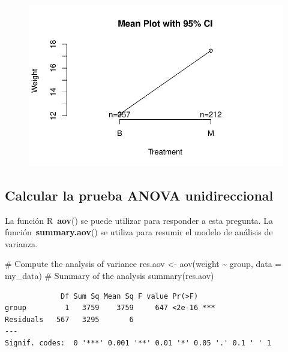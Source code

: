 \documentclass[
  letterpaper,
  DIV=11,
  numbers=noendperiod]{scrartcl}
\newenvironment{Shaded}{\begin{snugshade}}{\end{snugshade}}
\newcommand{\AttributeTok}[1]{\textcolor[rgb]{0.40,0.45,0.13}{#1}}
\newcommand{\CommentTok}[1]{\textcolor[rgb]{0.37,0.37,0.37}{#1}}
\newcommand{\FunctionTok}[1]{\textcolor[rgb]{0.28,0.35,0.67}{#1}}
\newcommand{\NormalTok}[1]{\textcolor[rgb]{0.00,0.23,0.31}{#1}}
\newcommand{\OtherTok}[1]{\textcolor[rgb]{0.00,0.23,0.31}{#1}}
\newcommand{\SpecialCharTok}[1]{\textcolor[rgb]{0.37,0.37,0.37}{#1}}
\begin{document}
\begin{figure}[H]

{\centering \includegraphics{ANOVA_files/figure-pdf/unnamed-chunk-5-3.pdf}

}

\end{figure}

\hypertarget{calcular-la-prueba-anova-unidireccional}{%
\subsection{Calcular la prueba ANOVA
unidireccional}\label{calcular-la-prueba-anova-unidireccional}}

La función R~\textbf{aov}() se puede utilizar para responder a esta
pregunta. La función~\textbf{summary.aov}() se utiliza para resumir el
modelo de análisis de varianza.

\begin{Shaded}
\begin{Highlighting}[]
\CommentTok{\# Compute the analysis of variance}
\NormalTok{res.aov }\OtherTok{\textless{}{-}} \FunctionTok{aov}\NormalTok{(weight }\SpecialCharTok{\textasciitilde{}}\NormalTok{ group, }\AttributeTok{data =}\NormalTok{ my\_data)}
\CommentTok{\# Summary of the analysis}
\FunctionTok{summary}\NormalTok{(res.aov)}
\end{Highlighting}
\end{Shaded}

\begin{verbatim}
             Df Sum Sq Mean Sq F value Pr(>F)    
group         1   3759    3759     647 <2e-16 ***
Residuals   567   3295       6                   
---
Signif. codes:  0 '***' 0.001 '**' 0.01 '*' 0.05 '.' 0.1 ' ' 1
\end{verbatim}
\end{document}
